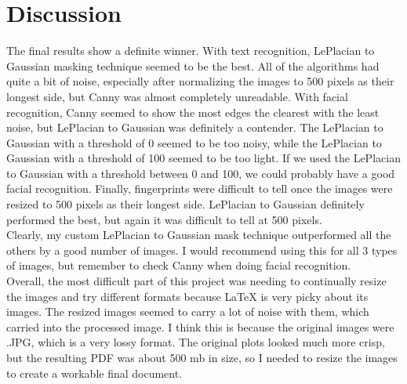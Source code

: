 \documentclass{article}%
\begin{document}
\section{Discussion}
The final results show a definite winner. With text recognition, LePlacian to Gaussian masking technique seemed to be the best. All of the algorithms had quite a bit of noise, especially after normalizing the images to 500 pixels as their longest side, but Canny was almost completely unreadable. With facial recognition, Canny seemed to show the most edges the clearest with the least noise, but LePlacian to Gaussian was definitely a contender. The LePlacian to Gaussian with a threshold of 0 seemed to be too noisy, while the LePlacian to Gaussian with a threshold of 100 seemed to be too light. If we used the LePlacian to Gaussian with a threshold between 0 and 100, we could probably have a good facial recognition. Finally, fingerprints were difficult to tell once the images were resized to 500 pixels as their longest side. LePlacian to Gaussian definitely performed the best, but again it was difficult to tell at 500 pixels. \\
\indent Clearly, my custom LePlacian to Gaussian mask technique outperformed all the others by a good number of images. I would recommend using this for all 3 types of images, but remember to check Canny when doing facial recognition. \\
\indent Overall, the most difficult part of this project was needing to continually resize the images and try different formats because {\LaTeX} is very picky about its images. The resized images seemed to carry a lot of noise with them, which carried into the processed image. I think this is because the original images were .JPG, which is a very lossy format. The original plots looked much more crisp, but the resulting PDF was about 500 mb in size, so I needed to resize the images to create a workable final document.
\end{document}
